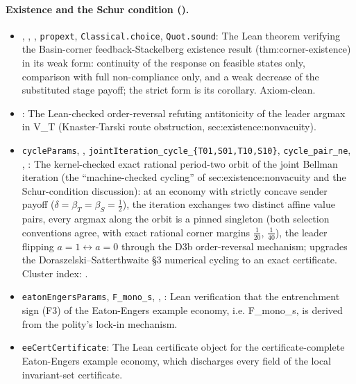 \paragraph{Existence and the Schur condition ().}
\begin{itemize}[leftmargin=1.4em,itemsep=1pt]
\item {}, , , \texttt{propext}, \texttt{Classical.choice}, \texttt{Quot.sound}: The Lean theorem verifying the Basin-corner feedback-Stackelberg existence result (thm:corner-existence) in its weak form: continuity of the response on feasible states only, comparison with full non-compliance only, and a weak decrease of the substituted stage payoff; the strict form  is its corollary. Axiom-clean.
\item {}: The Lean-checked order-reversal refuting antitonicity of the leader argmax in V\_T (Knaster-Tarski route obstruction, sec:existence:nonvacuity).
\item \texttt{cycleParams}, , \texttt{jointIteration\_cycle\_\{T01,S01,T10,S10\}}, \texttt{cycle\_pair\_ne}, , : The kernel-checked exact rational period-two orbit of the joint Bellman iteration (the ``machine-checked cycling'' of sec:existence:nonvacuity and the Schur-condition discussion): at an economy with strictly concave sender payoff ($\delta=\beta_T=\beta_S=\tfrac12$), the iteration exchanges two distinct affine value pairs, every argmax along the orbit is a pinned singleton (both selection conventions agree, with exact rational corner margins $\tfrac1{20}$, $\tfrac1{40}$), the leader flipping $a{=}1\leftrightarrow a{=}0$ through the D3b order-reversal mechanism; upgrades the Doraszelski--Satterthwaite \S3 numerical cycling to an exact certificate. Cluster index: .
\item \texttt{eatonEngersParams}, \texttt{F\_mono\_s}, , : Lean verification that the entrenchment sign (F3) of the Eaton-Engers example economy, i.e. F\_mono\_s, is derived from the polity's lock-in mechanism.
\item \texttt{eeCertCertificate}: The Lean certificate object for the certificate-complete Eaton-Engers example economy, which discharges every field of the local invariant-set certificate.

\end{itemize}
